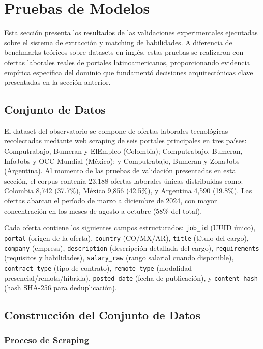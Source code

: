 \section{Pruebas de Modelos}

Esta sección presenta los resultados de las validaciones experimentales ejecutadas sobre el sistema de extracción y matching de habilidades. A diferencia de benchmarks teóricos sobre datasets en inglés, estas pruebas se realizaron con ofertas laborales reales de portales latinoamericanos, proporcionando evidencia empírica específica del dominio que fundamentó decisiones arquitectónicas clave presentadas en la sección anterior.

\subsection{Conjunto de Datos}

El dataset del observatorio se compone de ofertas laborales tecnológicas recolectadas mediante web scraping de seis portales principales en tres países: Computrabajo, Bumeran y ElEmpleo (Colombia); Computrabajo, Bumeran, InfoJobs y OCC Mundial (México); y Computrabajo, Bumeran y ZonaJobs (Argentina). Al momento de las pruebas de validación presentadas en esta sección, el corpus contenía 23,188 ofertas laborales únicas distribuidas como: Colombia 8,742 (37.7\%), México 9,856 (42.5\%), y Argentina 4,590 (19.8\%). Las ofertas abarcan el período de marzo a diciembre de 2024, con mayor concentración en los meses de agosto a octubre (58\% del total).

Cada oferta contiene los siguientes campos estructurados: \texttt{job\_id} (UUID único), \texttt{portal} (origen de la oferta), \texttt{country} (CO/MX/AR), \texttt{title} (título del cargo), \texttt{company} (empresa), \texttt{description} (descripción detallada del cargo), \texttt{requirements} (requisitos y habilidades), \texttt{salary\_raw} (rango salarial cuando disponible), \texttt{contract\_type} (tipo de contrato), \texttt{remote\_type} (modalidad presencial/remota/híbrida), \texttt{posted\_date} (fecha de publicación), y \texttt{content\_hash} (hash SHA-256 para deduplicación).

\subsection{Construcción del Conjunto de Datos}

\subsubsection{Proceso de Scraping}

